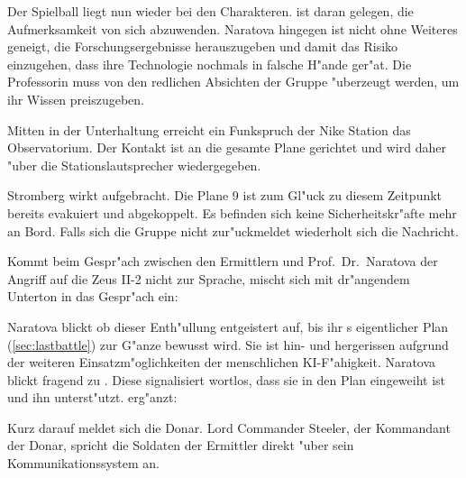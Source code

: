Der Spielball liegt nun wieder bei den Charakteren. \xl{} ist daran gelegen, die Aufmerksamkeit von sich abzuwenden. Naratova hingegen ist nicht ohne Weiteres geneigt, die Forschungsergebnisse herauszugeben und damit das Risiko einzugehen, dass ihre Technologie nochmals in falsche H"ande ger"at. Die Professorin muss von den redlichen Absichten der Gruppe "uberzeugt werden, um ihr Wissen preiszugeben.

Mitten in der Unterhaltung erreicht ein Funkspruch der Nike Station das Observatorium. Der Kontakt ist an die gesamte Plane gerichtet und wird daher "uber die Stationslautsprecher wiedergegeben.


Stromberg wirkt aufgebracht. Die Plane 9 ist zum Gl"uck zu diesem Zeitpunkt bereits evakuiert und abgekoppelt. Es befinden sich keine Sicherheitskr"afte mehr an Bord. Falls sich die Gruppe nicht zur"uckmeldet wiederholt sich die Nachricht. 

Kommt beim Gespr"ach zwischen den Ermittlern und Prof.~Dr.~Naratova der Angriff auf die Zeus II-2 nicht zur Sprache, mischt sich \xl{} mit dr"angendem Unterton in das Gespr"ach ein:


Naratova blickt ob dieser Enth"ullung entgeistert auf, bis ihr \xl{}s eigentlicher Plan (\cref{sec:lastbattle}) zur G"anze bewusst wird. Sie ist hin- und hergerissen aufgrund der weiteren Einsatzm"oglichkeiten der menschlichen KI-F"ahigkeit. Naratova blickt fragend zu \ml{}. Diese signalisiert wortlos, dass sie in den Plan eingeweiht ist und ihn unterst"utzt. \ml{} erg"anzt:


Kurz darauf meldet sich die Donar. Lord Commander Steeler, der Kommandant der Donar, spricht die Soldaten der Ermittler direkt "uber sein Kommunikationssystem an.

